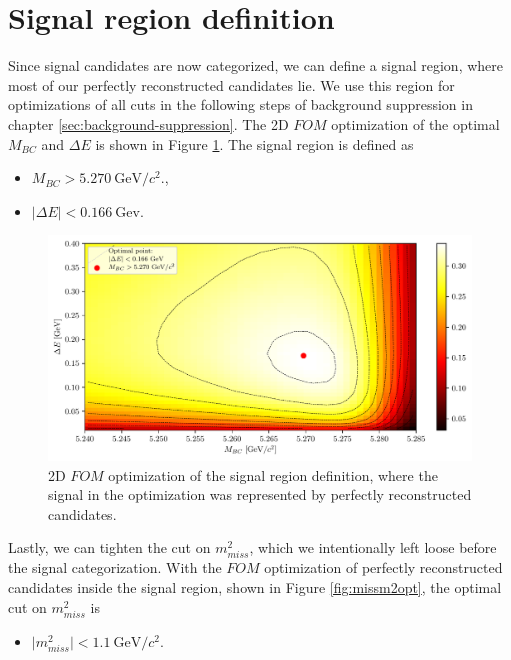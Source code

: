 \documentclass[oneside,a4paper,openany,12pt]{scrbook}
\newcommand {\e}[1]{\mathrm{~#1}}
\begin{document}
\section{Signal region definition}

Since signal candidates are now categorized, we can define a signal region, where most of our perfectly reconstructed candidates lie. We use this region for optimizations of all cuts in the following steps of background suppression in chapter \ref{sec:background-suppression}. The 2D $FOM$ optimization of the optimal $M_{BC}$ and $\Delta E$ is shown in Figure \ref{fig:sigwin}.
The signal region is defined as
\begin{itemize}
\item $M_{BC} > 5.270\e{GeV}/c^2.$,
\item $\vert \Delta E \vert < 0.166\e{Gev}$. 
\end{itemize}

\begin{figure}[H]
\centering
\captionsetup{width=0.8\linewidth}
\includegraphics[width=\linewidth]{fig/sigWin}
\caption{2D $FOM$ optimization of the signal region definition, where the signal in the optimization was represented by perfectly reconstructed candidates.}
\label{fig:sigwin}
\end{figure}

Lastly, we can tighten the cut on $m_{miss}^2$, which we intentionally left loose before the signal categorization. With the $FOM$ optimization of perfectly reconstructed candidates inside the signal region, shown in Figure \ref{fig:missm2opt}, the optimal cut on $m_{miss}^2$ is 

\begin{itemize}
\item $\vert m_{miss}^2 \vert < 1.1\e{GeV}/c^2$.
\end{itemize}
\end{document}
